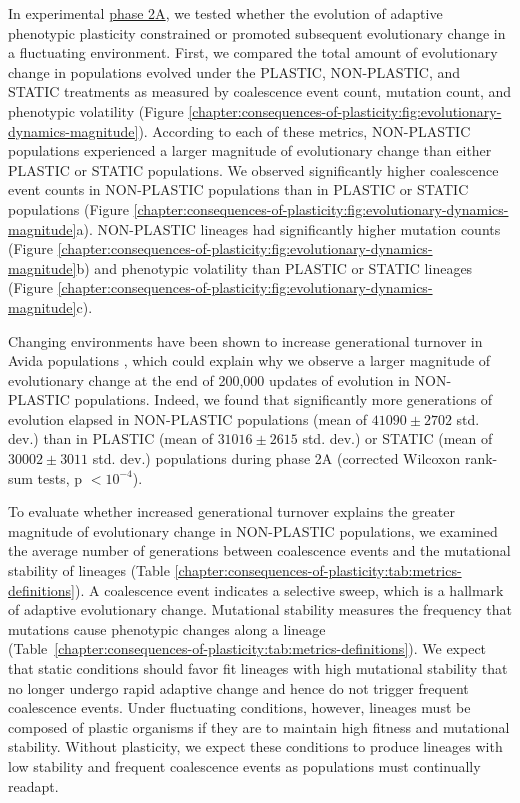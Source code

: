 

In experimental \hyperref[chapter:consequences-of-plasticity:sec:methods:experiment:evolutionary-change-rate]{phase 2A},
we tested whether the evolution of adaptive phenotypic plasticity constrained or promoted subsequent evolutionary change in a fluctuating environment. 
First, we compared the total amount of evolutionary change in populations evolved under the PLASTIC, NON-PLASTIC, and STATIC treatments as measured by coalescence event count, mutation count, and phenotypic volatility (Figure \ref{chapter:consequences-of-plasticity:fig:evolutionary-dynamics-magnitude}).
According to each of these metrics, NON-PLASTIC populations experienced a larger magnitude of evolutionary change than either PLASTIC or STATIC populations.
We observed significantly higher coalescence event counts in NON-PLASTIC populations than in PLASTIC or STATIC populations (Figure \ref{chapter:consequences-of-plasticity:fig:evolutionary-dynamics-magnitude}a).
NON-PLASTIC lineages had significantly higher mutation counts (Figure \ref{chapter:consequences-of-plasticity:fig:evolutionary-dynamics-magnitude}b) and phenotypic volatility than PLASTIC or STATIC lineages (Figure \ref{chapter:consequences-of-plasticity:fig:evolutionary-dynamics-magnitude}c).

Changing environments have been shown to increase generational turnover in Avida populations \citep{canino-koning_evolution_2016}, which could explain why we observe a larger magnitude of evolutionary change at the end of 200,000 updates of evolution in NON-PLASTIC populations. 
Indeed, we found that significantly more generations of evolution elapsed in NON-PLASTIC populations (mean of $41090\pm2702$ std. dev.) than in PLASTIC (mean of $31016\pm2615$ std. dev.) or STATIC (mean of $30002\pm3011$ std. dev.) populations during phase 2A (corrected Wilcoxon rank-sum tests, p $<10^{-4}$).

To evaluate whether increased generational turnover explains the greater magnitude of evolutionary change in NON-PLASTIC populations, we examined the average number of generations between coalescence events and the mutational stability of lineages (Table \ref{chapter:consequences-of-plasticity:tab:metrics-definitions}).
A coalescence event indicates a selective sweep, which is a hallmark of adaptive evolutionary change.
Mutational stability measures the frequency that mutations cause phenotypic changes along a lineage (Table~\ref{chapter:consequences-of-plasticity:tab:metrics-definitions}).
We expect that static conditions should favor fit lineages with high mutational stability that no longer undergo rapid adaptive change and hence do not trigger frequent coalescence events.
Under fluctuating conditions, however, lineages must be composed of plastic organisms if they are to maintain high fitness and mutational stability.
Without plasticity, we expect these conditions to produce lineages with low stability and frequent coalescence events as populations must continually readapt.

